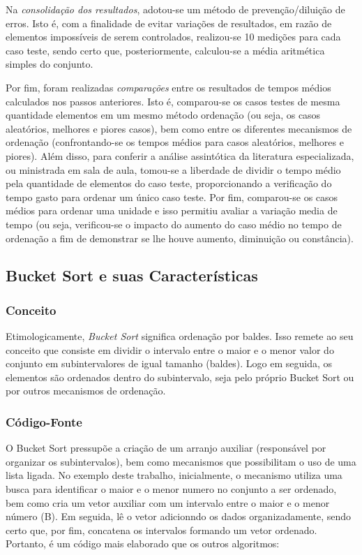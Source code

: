 \documentclass[a4paper, 12pt]{article}
\begin{document}
Na \textit{consolidação dos resultados}, adotou-se um método de prevenção/diluição de erros. Isto é, com a finalidade de evitar variações de resultados, em razão de elementos impossíveis de serem controlados, realizou-se 10 medições para cada caso teste, sendo certo que, posteriormente, calculou-se a média aritmética simples do conjunto.

Por fim, foram realizadas \textit{comparações} entre os resultados de tempos médios calculados nos passos anteriores. Isto é, comparou-se os casos testes de mesma quantidade elementos em um mesmo método ordenação (ou seja, os casos aleatórios, melhores e piores casos), bem como entre os diferentes mecanismos de ordenação (confrontando-se os tempos médios para casos aleatórios, melhores e piores).  Além disso, para conferir a análise assintótica da literatura especializada, ou ministrada em sala de aula, tomou-se a liberdade de dividir o tempo médio pela quantidade de elementos do caso teste, proporcionando a verificação do tempo gasto para ordenar um único caso teste. Por fim, comparou-se os casos médios para ordenar uma unidade e isso permitiu avaliar a variação media de tempo (ou seja, verificou-se o impacto do aumento do caso médio no tempo de ordenação a fim de demonstrar se lhe houve aumento, diminuição ou constância).


\vspace{0.8cm}
\subsection{Bucket Sort e suas Características}
\subsubsection{Conceito}
\tab Etimologicamente, \textit{Bucket Sort} significa ordenação por baldes. Isso remete ao seu conceito que consiste em dividir o intervalo entre o maior e o menor valor do conjunto em subintervalores de igual tamanho (baldes). Logo em seguida, os elementos são ordenados dentro do subintervalo, seja pelo próprio Bucket Sort ou por outros mecanismos de ordenação.

\vspace{0.8cm}
\subsubsection{Código-Fonte}
\tab{} O Bucket Sort pressupõe a criação de um arranjo auxiliar (responsável por organizar os subintervalos), bem como mecanismos que possibilitam o uso de uma lista ligada. No exemplo deste trabalho, inicialmente, o mecanismo utiliza uma busca para identificar o maior e o menor numero no conjunto a ser ordenado, bem como cria um vetor auxiliar com um intervalo entre o maior e o menor número (B). Em seguida, lê o vetor adicionndo os dados organizadamente, sendo certo que, por fim, concatena os intervalos formando um vetor ordenado. Portanto, é um código mais elaborado que os outros algoritmos:
\end{document}
